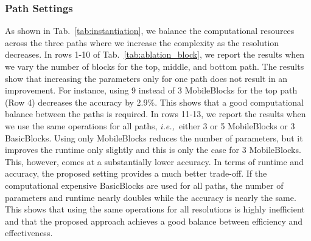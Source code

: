 \documentclass[letterpaper, 10 pt, journal, twoside]{ieeetran}
\newcommand{\tabref}[1]{Tab.~\ref{#1}}
\def\ie{\textit{i.e.,~}}
\begin{document}
\subsubsection{Path Settings}
As shown in \tabref{tab:instantiation}, we balance the computational resources across the three paths where we increase the complexity as the resolution decreases. 
In rows \mbox{1-10} of \tabref{tab:ablation_block}, we report the results when we vary the number of blocks for the top, middle, and bottom path. The results show that increasing the parameters only for one path does not result in an improvement. For instance, using 9 instead of 3 MobileBlocks for the top path (Row 4) decreases the accuracy by $2.9\%$. This shows that a good computational balance between the paths is required. In rows 11-13, we report the results when we use the same operations for all paths, \ie either 3 or 5 MobileBlocks or 3 BasicBlocks.
Using only MobileBlocks reduces the number of parameters, but it improves the runtime only slightly and this is only the case for 3 MobileBlocks. This, however, comes at a substantially lower accuracy. 
In terms of runtime and accuracy, the proposed setting provides a much better trade-off. 
If the computational expensive BasicBlocks are used for all paths, the number of parameters and runtime nearly doubles while the accuracy is nearly the same. 
This shows that using the same operations for all resolutions is highly inefficient and that the proposed approach achieves a good balance between efficiency and effectiveness.
\end{document}

